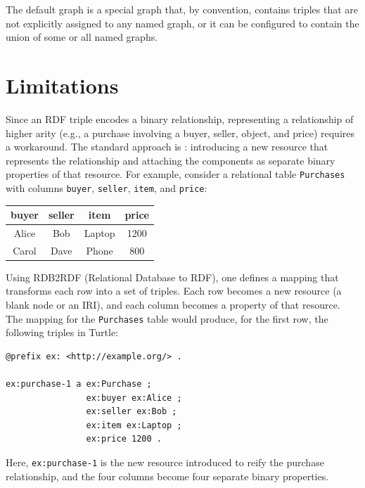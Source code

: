 The default graph is a special graph that, by convention, contains triples that are not explicitly assigned to any named graph, or it can be configured to contain the union of some or all named graphs. 

\section{Limitations}
Since an RDF triple encodes a binary relationship, representing a relationship of higher arity (e.g., a purchase involving a buyer, seller, object, and price) requires a workaround. The standard approach is : introducing a new resource that represents the relationship and attaching the components as separate binary properties of that resource. For example, consider a relational table \texttt{Purchases} with columns \texttt{buyer}, \texttt{seller}, \texttt{item}, and \texttt{price}:

\begin{table}[H]
    \centering
    \begin{tabular}{cccc}
        \toprule
        \textbf{buyer} & \textbf{seller} & \textbf{item} & \textbf{price} \\
        \midrule
        Alice & Bob & Laptop & 1200 \\
        Carol & Dave & Phone & 800 \\
        \bottomrule
    \end{tabular}
\end{table}

Using RDB2RDF (Relational Database to RDF), one defines a mapping that transforms each row into a set of triples. 
Each row becomes a new resource (a blank node or an IRI), and each column becomes a property of that resource. 
The mapping for the \texttt{Purchases} table would produce, for the first row, the following triples in Turtle:

\begin{lstlisting}[caption=RDB2RDF output for a purchase]
@prefix ex: <http://example.org/> .

ex:purchase-1 a ex:Purchase ;
                ex:buyer ex:Alice ;
                ex:seller ex:Bob ;
                ex:item ex:Laptop ;
                ex:price 1200 .
\end{lstlisting}

Here, \texttt{ex:purchase-1} is the new resource introduced to reify the purchase relationship, and the four columns become four separate binary properties. 

